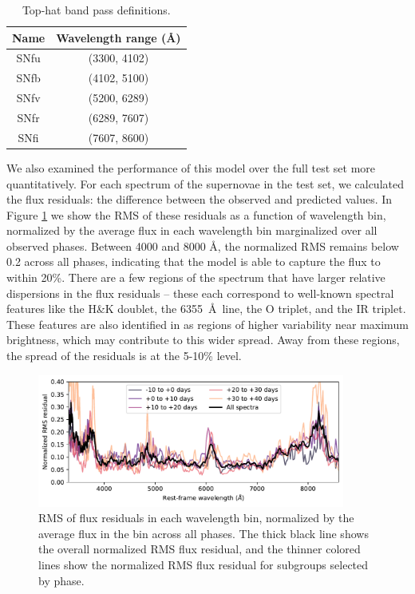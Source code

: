 \begin{table}[htpb]
    \centering
    \begin{tabular}{cc}\toprule
        Name & Wavelength range (\AA) \\\midrule
        SNfu & (3300, 4102)\\
        SNfb & (4102, 5100)\\
        SNfv & (5200, 6289)\\
        SNfr & (6289, 7607)\\
        SNfi & (7607, 8600)\\\bottomrule
    \end{tabular}
    \caption{Top-hat band pass definitions.}
    \label{tab:snf_tophats}
\end{table}

We also examined the performance of this model over the full test set more quantitatively. For each spectrum of the supernovae in the test set, we calculated the flux residuals: the difference between the observed and predicted values. In Figure \ref{fig:e2s_wavelength_resids} we show the RMS of these residuals as a function of wavelength bin, normalized by the average flux in each wavelength bin marginalized over all observed phases. Between 4000 and 8000 \AA, the normalized RMS remains below 0.2 across all phases, indicating that the model is able to capture the flux to within 20\%. There are a few regions of the spectrum that have larger relative dispersions in the flux residuals -- these each correspond to well-known spectral features like the  H\&K doublet, the  6355~\AA\ line, the O triplet, and the  IR triplet. These features are also identified in  as regions of higher variability near maximum brightness, which may contribute to this wider spread. Away from these regions, the spread of the residuals is at the 5-10\% level.

\begin{figure}
    \centering
\includegraphics[width=0.9\textwidth]{figures/nn_twins/embed2spec_rms_wavelength.pdf}
    \caption{RMS of \etos{} flux residuals in each wavelength bin, normalized by the average flux in the bin across all phases. The thick black line shows the overall normalized RMS flux residual, and the thinner colored lines show the normalized RMS flux residual for subgroups selected by phase.}
    \label{fig:e2s_wavelength_resids}
\end{figure}

